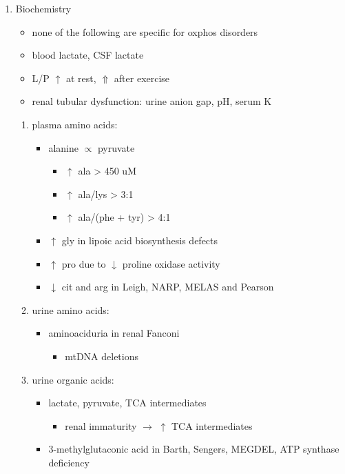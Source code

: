\documentclass{scrartcl}
\begin{document}
\begin{enumerate}
\item Biochemistry
\label{sec:org7904edb}
\begin{itemize}
\item none of the following are specific for oxphos disorders
\item blood lactate, CSF lactate
\item L/P \(\uparrow\) at rest, \(\Uparrow\) after exercise
\item renal tubular dysfunction: urine anion gap, pH, serum K
\end{itemize}
\begin{enumerate}
\item plasma amino acids:
\label{sec:orgbabb72f}
\begin{itemize}
\item alanine \(\propto\) pyruvate
\begin{itemize}
\item \(\uparrow\) ala \textgreater{} 450 uM
\item \(\uparrow\) ala/lys \textgreater{} 3:1
\item \(\uparrow\) ala/(phe + tyr) \textgreater{} 4:1
\end{itemize}
\item \(\uparrow\) gly in lipoic acid biosynthesis defects
\item \(\uparrow\) pro due to \(\downarrow\) proline oxidase activity
\item \(\downarrow\) cit and arg in Leigh, NARP, MELAS and Pearson
\end{itemize}
\item urine amino acids:
\label{sec:orgc34b04b}
\begin{itemize}
\item aminoaciduria in renal Fanconi
\begin{itemize}
\item mtDNA deletions
\end{itemize}
\end{itemize}
\item urine organic acids:
\label{sec:org26edfdb}
\begin{itemize}
\item lactate, pyruvate, TCA intermediates
\begin{itemize}
\item renal immaturity \(\to\) \(\uparrow\) TCA intermediates
\end{itemize}
\item 3-methylglutaconic acid in Barth, Sengers, MEGDEL, ATP synthase deficiency

\end{itemize}
\end{enumerate}
\end{enumerate}
\end{document}
